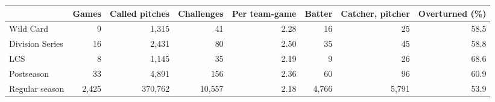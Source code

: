 \begin{tabular}{lrrrrrrr}
\toprule
 & Games & Called pitches & Challenges & Per team-game & Batter & Catcher, pitcher & Overturned (\%) \\
\midrule
Wild Card & 9 & 1{,}315 & 41 & 2.28 & 16 & 25 & 58.5 \\
Division Series & 16 & 2{,}431 & 80 & 2.50 & 35 & 45 & 58.8 \\
LCS & 8 & 1{,}145 & 35 & 2.19 & 9 & 26 & 68.6 \\
Postseason & 33 & 4{,}891 & 156 & 2.36 & 60 & 96 & 60.9 \\
Regular season & 2{,}425 & 370{,}762 & 10{,}557 & 2.18 & 4{,}766 & 5{,}791 & 53.9 \\
\bottomrule
\end{tabular}
